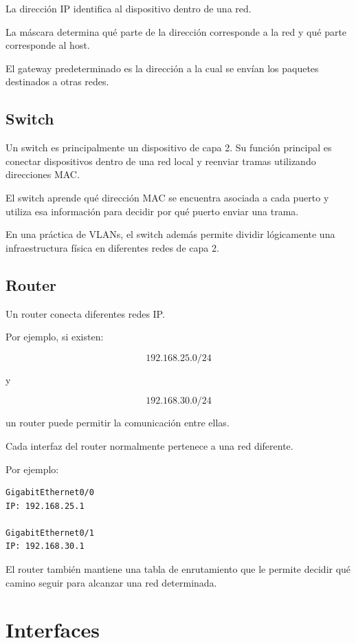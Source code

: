 \documentclass[12pt]{article}
\begin{document}
La dirección IP identifica al dispositivo dentro de una red.

La máscara determina qué parte de la dirección corresponde a la red y qué
parte corresponde al host.

El gateway predeterminado es la dirección a la cual se envían los paquetes
destinados a otras redes.


\subsection{Switch}

Un switch es principalmente un dispositivo de capa 2. Su función principal
es conectar dispositivos dentro de una red local y reenviar tramas
utilizando direcciones MAC.

El switch aprende qué dirección MAC se encuentra asociada a cada puerto y
utiliza esa información para decidir por qué puerto enviar una trama.

En una práctica de VLANs, el switch además permite dividir lógicamente una
infraestructura física en diferentes redes de capa 2.


\subsection{Router}

Un router conecta diferentes redes IP.

Por ejemplo, si existen:

\[
192.168.25.0/24
\]

y

\[
192.168.30.0/24
\]

un router puede permitir la comunicación entre ellas.

Cada interfaz del router normalmente pertenece a una red diferente.

Por ejemplo:

\begin{lstlisting}
GigabitEthernet0/0
IP: 192.168.25.1

GigabitEthernet0/1
IP: 192.168.30.1
\end{lstlisting}

El router también mantiene una tabla de enrutamiento que le permite decidir
qué camino seguir para alcanzar una red determinada.


\section{Interfaces}
\end{document}
